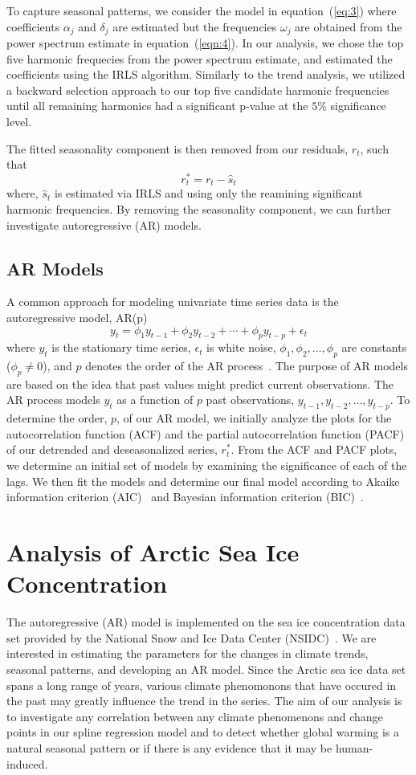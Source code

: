 \documentclass[12pt]{article}
\begin{document}
To capture seasonal patterns, we consider the model in equation~(\ref{eq:3})
where coefficients $\alpha_j$ and $\delta_j$ are estimated but the frequencies
$\omega_j$ are obtained from the power spectrum estimate in equation~(\ref{eqn:4}). In our analysis, we chose the top five harmonic frequecies from the power spectrum estimate, and estimated the coefficients using the IRLS algorithm. Similarly to the trend analysis, we utilized a backward selection approach to our top five candidate harmonic frequencies until all remaining harmonics had a significant p-value at the $5\%$ significance level.

The fitted seasonality component is then removed from our residuals, $r_t$, such that
$$r^{*}_t = r_t - \hat{s}_t$$
where, $\hat{s}_t$ is estimated via IRLS and using only the reamining significant harmonic frequencies. By removing the seasonality component, we can further investigate autoregressive (AR) models.

\subsection{AR Models}
A common approach for modeling univariate time series data is the autoregressive model, AR(p)
$$y_t = \phi_{1}y_{t-1} + \phi_{2}y_{t-2} + \cdots + \phi_{p}y_{t-p} + \epsilon_t$$
where $y_t$ is the stationary time series, $\epsilon_t$ is white noise, $\phi_1, \phi_2, \dots, \phi_p$ are constants ($\phi_p \neq 0$), and $p$ denotes the order of the AR process~\citep{shumway}. The purpose of AR models are based on the idea that past values might predict current observations. The AR process models $y_t$ as a function of $p$ past observations, $y_{t-1}, y_{t-2}, \dots, y_{t-p}$. To determine the order, $p$, of our AR model, we initially analyze the plots for the autocorrelation function (ACF) and the partial autocorrelation function (PACF) of our detrended and deseasonalized series, $r^{*}_{t}$. From the ACF and PACF plots, we determine an initial set of models by examining the significance of each of the lags. We then fit the models and determine our final model according to Akaike information criterion (AIC)~\citep{aic} and Bayesian information criterion (BIC)~\citep{bic}.


\section{Analysis of Arctic Sea Ice Concentration} \label{sec:analysis}
The autoregressive (AR) model is implemented on the sea ice concentration data set provided by the National Snow and Ice Data Center (NSIDC)~\citep{data}. We are interested in estimating the parameters for the changes in climate trends, seasonal patterns, and developing an AR model. Since the Arctic sea ice data set spans a long range of years, various climate phenomonons that have occured in the past may greatly influence the trend in the series. The aim of our analysis is to investigate any correlation between any climate phenomenons and change points in our spline regression model and to detect whether global warming is a natural seasonal pattern or if there is any evidence that it may be human-induced.
\end{document}
